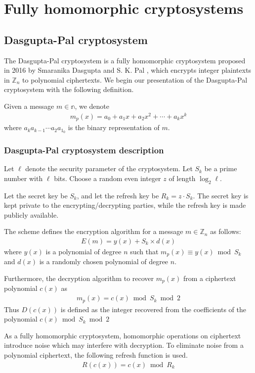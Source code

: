 \section{Fully homomorphic cryptosystems}
\subsection{Dasgupta-Pal cryptosystem}
The Dasgupta-Pal cryptosystem is a fully homomorphic cryptosystem proposed in 2016 by Smaranika Dasgupta and S. K. Pal \cite{dasgupta_design_2016}, which encrypts integer plaintexts in $\mathbb{Z}_n$ to polynomial ciphertexts. We begin our presentation of the Dasgupta-Pal cryptosystem with the following definition.

Given a message $m \in \mathbb{n}$, we denote
\begin{align*}
		m_p(x) = a_0 + a_1x + a_2x^2 + \cdots + a_kx^k
\end{align*}
where $a_ka_{k-1}\cdots a_2a_1_0$ is the binary representation of $m$.
\subsubsection{Dasgupta-Pal cryptosystem description}
Let $\ell$ denote the security parameter of the cryptosystem.
Let $S_k$ be a prime number with $\ell$ bits.
Choose a random even integer $z$ of length $\log_2{\ell}$.

Let the secret key be $S_k$, and let the refresh key be $R_k = z \cdot S_k$. The secret key is kept private to the encrypting/decrypting parties, while the refresh key is made publicly available.

The scheme defines the encryption algorithm for a message $m \in \mathbb{Z}_n$ as follows:
\begin{align*}
	E(m) = y(x) + S_k\times d(x)
\end{align*}
where
$y(x)$ is a polynomial of degree $n$ such that $m_p(x) \equiv y(x) \bmod S_k$ and $d(x)$ is a randomly chosen polynomial of degree $n$.

Furthermore, the decryption algorithm to recover $m_p(x)$ from a ciphertext polynomial $c(x)$ as
\begin{align*}
	m_p(x) = c(x) \bmod S_k \bmod 2
\end{align*}
Thus $D(c(x))$ is defined as the integer recovered from the coefficients of the polynomial $c(x) \bmod S_k \bmod 2$

As a fully homomorphic cryptosystem, homomorphic operations on ciphertext introduce noise which may interfere with decryption.
To eliminate noise from a polynomial ciphertext, the following refresh function is used.
\begin{align*}
	R(c(x)) = c(x) \bmod R_k
\end{align*}

